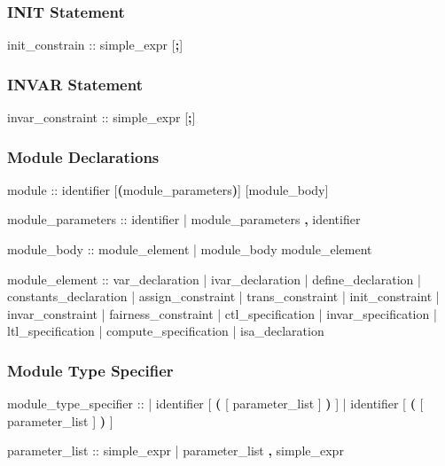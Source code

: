 \subsubsection{INIT Statement}
\begin{Grammar}
init_constrain ::  simple_expr [\textbf{;}]
\end{Grammar}


\subsubsection{INVAR Statement}
\begin{Grammar}
invar_constraint ::  simple_expr [\textbf{;}]
\end{Grammar}


\subsubsection{Module Declarations}
\begin{Grammar}
module ::  identifier [\textbf{(}module_parameters\textbf{)}] [module_body]

module_parameters ::
          identifier
        | module_parameters \textbf{,} identifier

module_body :: 
          module_element 
        | module_body module_element
           
module_element ::
          var_declaration
        | ivar_declaration
        | define_declaration
        | constants_declaration
        | assign_constraint
        | trans_constraint
        | init_constraint
        | invar_constraint
        | fairness_constraint
        | ctl_specification
        | invar_specification
        | ltl_specification
        | compute_specification
        | isa_declaration
\end{Grammar}


\subsubsection{Module Type Specifier}
\begin{Grammar}
module_type_specifier ::     
      | identifier [ \textbf{(} [ parameter_list ] \textbf{)} ]
      |  identifier [ \textbf{(} [ parameter_list ] \textbf{)} ]

parameter_list ::
        simple_expr
      | parameter_list \textbf{,} simple_expr
\end{Grammar}


